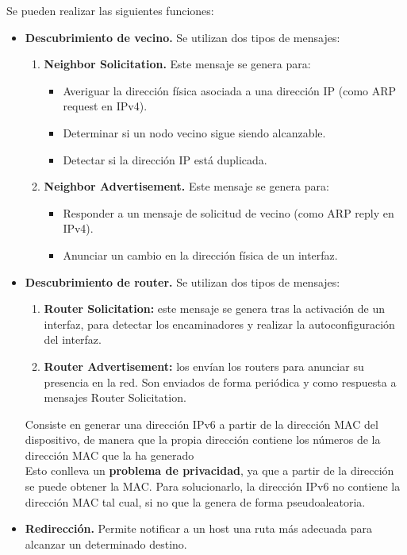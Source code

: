 \begin{onepage}
Se pueden realizar las siguientes funciones:
\begin{itemize}
    \item \textbf{Descubrimiento de vecino.} Se utilizan dos tipos de mensajes:
    \begin{enumerate}
        \item \textbf{Neighbor Solicitation.}
        Este mensaje se genera para:
        \begin{itemize}
            \item Averiguar la dirección física asociada a una dirección IP (como ARP request en IPv4).
            \item Determinar si un nodo vecino sigue siendo alcanzable.
            \item Detectar si la dirección IP está duplicada.
        \end{itemize}
        \item \textbf{Neighbor Advertisement.}
        Este mensaje se genera para:
        \begin{itemize}
            \item Responder a un mensaje de solicitud de vecino (como ARP reply en IPv4).
            \item Anunciar un cambio en la dirección física de un interfaz.
        \end{itemize}
    \end{enumerate}
    \item \textbf{Descubrimiento de router.} Se utilizan dos tipos de mensajes:
    \begin{enumerate}
        \item \textbf{Router Solicitation:} este mensaje se genera tras la activación de un interfaz, para detectar los encaminadores y realizar la autoconfiguración del interfaz.
        \item \textbf{Router Advertisement:} los envían los routers para anunciar su presencia en la red. Son enviados de forma periódica y como respuesta a mensajes Router Solicitation.
    \end{enumerate}
    \begin{tcolorbox}[
title=Método EUI-65,
colback=cyan!5!white,
colframe=cyan!75!black,
fonttitle=\bfseries]
Consiste en generar una dirección IPv6 a partir de la dirección MAC del dispositivo, de manera que la propia dirección contiene los números de la dirección MAC que la ha generado\\

Esto conlleva un \textbf{problema de privacidad}, ya que a partir de la dirección se puede obtener la MAC. Para solucionarlo, la dirección IPv6 no contiene la dirección MAC tal cual, si no que la genera de forma pseudoaleatoria.
\end{tcolorbox}
    \item \textbf{Redirección.} Permite notificar a un host una ruta más adecuada para alcanzar un determinado destino.
\end{itemize}
\end{onepage}

